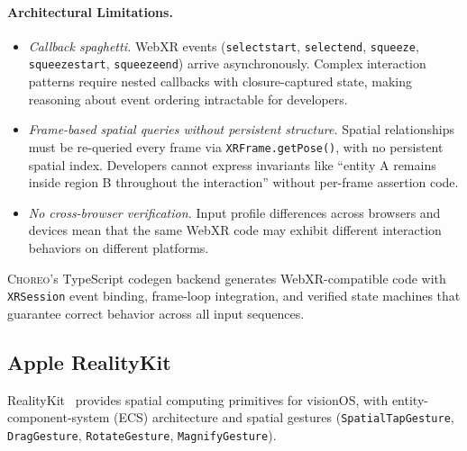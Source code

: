 \documentclass[11pt,a4paper]{article}
\begin{document}
\paragraph{Architectural Limitations.}
\begin{itemize}
\item \emph{Callback spaghetti.}
  WebXR events (\texttt{selectstart}, \texttt{selectend}, \texttt{squeeze},
  \texttt{squeezestart}, \texttt{squeezeend}) arrive asynchronously.
  Complex interaction patterns require nested callbacks with closure-captured state,
  making reasoning about event ordering intractable for developers.
\item \emph{Frame-based spatial queries without persistent structure.}
  Spatial relationships must be re-queried every frame via
  \texttt{XRFrame.getPose()}, with no persistent spatial index.
  Developers cannot express invariants like ``entity A remains inside region B
  throughout the interaction'' without per-frame assertion code.
\item \emph{No cross-browser verification.}
  Input profile differences across browsers and devices mean that the same
  WebXR code may exhibit different interaction behaviors on different platforms.
\end{itemize}

\textsc{Choreo}'s TypeScript codegen backend generates WebXR-compatible code with
\texttt{XRSession} event binding, frame-loop integration, and verified state
machines that guarantee correct behavior across all input sequences.

\subsection{Apple RealityKit}

RealityKit~\cite{realitykit2023} provides spatial computing primitives for
visionOS, with entity-component-system (ECS) architecture and spatial gestures
(\texttt{SpatialTapGesture}, \texttt{DragGesture}, \texttt{RotateGesture},
\texttt{MagnifyGesture}).
\end{document}
